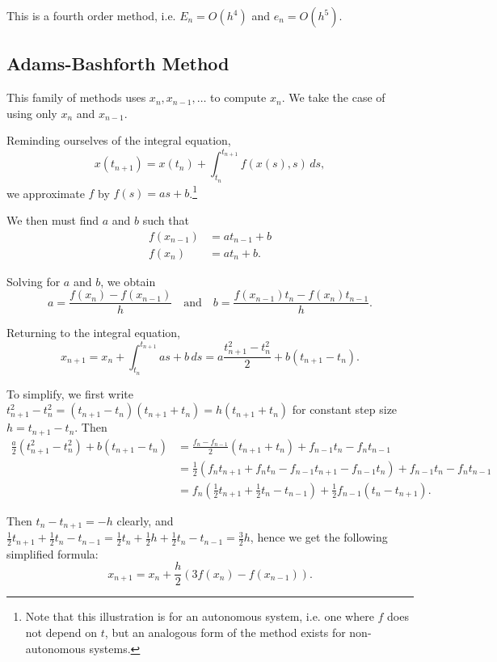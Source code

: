 This is a fourth order method, i.e. $E_n = O(h^4)$ and $e_n = O(h^5)$.

\subsection{Adams-Bashforth Method}

This family of methods uses $x_n, x_{n-1}, \dots$ to compute $x_n$. We take the case of using only $x_n$ and $x_{n-1}$. 

Reminding ourselves of the integral equation,
\[
x(t_{n+1}) = x(t_n) + \int_{t_n}^{t_{n+1}} f(x(s), s) \,ds,
\]
we approximate $f$ by $f(s) = as + b$.\footnote{Note that this illustration is for an autonomous system, i.e. one where $f$ does not depend on $t$, but an analogous form of the method exists for non-autonomous systems.}

We then must find $a$ and $b$ such that 
\begin{align*}
	f(x_{n-1}) &= a t_{n-1}+b \\
	f(x_n) &= a t_n + b.
\end{align*}

Solving for $a$ and $b$, we obtain
\[
a = \frac{f(x_n)-f(x_{n-1})}{h} \quad \text{and} \quad b = \frac{f(x_{n-1})t_n - f(x_n)t_{n-1}}{h}.
\]

Returning to the integral equation,
\[
x_{n+1} = x_n + \int_{t_n}^{t_{n+1}} as + b \,ds = a \frac{t_{n+1}^2 - t_n^2}{2} + b(t_{n+1} - t_n).
\]

To simplify, we first write $t_{n+1}^2 - t_n^2 = (t_{n+1} - t_n)(t_{n+1}+t_n) = h (t_{n+1}+t_n)$ for constant step size $h = t_{n+1} - t_n$. Then
\begin{align*}
	\frac{a}{2}(t_{n+1}^2 - t_n^2) + b(t_{n+1} - t_n) &= \frac{f_n - f_{n-1}}{2}(t_{n+1}+t_n) + f_{n-1}t_n - f_n t_{n-1} \\ 
	&= \frac12(f_n t_{n+1} + f_nt_n - f_{n-1}t_{n+1} - f_{n-1}t_n) + f_{n-1}t_n - f_n t_{n-1} \\ 
	&= f_n(\frac12 t_{n+1} + \frac12 t_n - t_{n-1}) + \frac12 f_{n-1}(t_n - t_{n+1}).
\end{align*}

Then $t_n - t_{n+1} = -h$ clearly, and $\frac12 t_{n+1} + \frac12 t_n - t_{n-1} = \frac12 t_n + \frac12 h + \frac12 t_n - t_{n-1} = \frac32 h$, hence we get the following simplified formula:
\begin{equation}
	x_{n+1} = x_n + \frac{h}{2}\left(3f(x_n) - f(x_{n-1})\right).
\end{equation}

